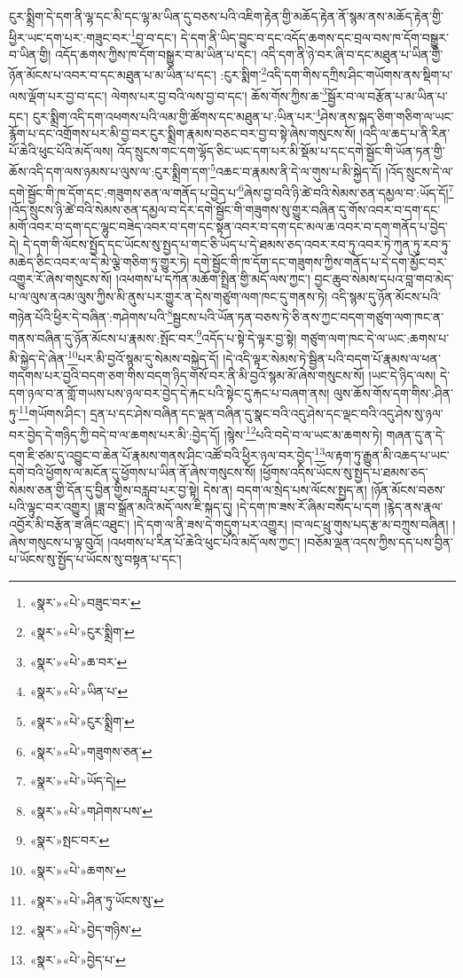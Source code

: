 ངུར་སྨྲིག་དེ་དག་ནི་ལྷ་དང་མི་དང་ལྷ་མ་ཡིན་དུ་བཅས་པའི་འཇིག་རྟེན་གྱི་མཆོད་རྟེན་ནོ་སྙམ་ནས་མཆོད་རྟེན་གྱི་ཕྱིར་ཡང་དག་པར་:གཟུང་བར་\footnote{«སྣར་»«པེ་»བཟུང་བར་}བྱ་བ་དང་། དེ་དག་ནི་ཡིད་བྱུང་བ་དང་འདོད་ཆགས་དང་བྲལ་བས་ཁ་དོག་བསྒྱུར་བ་ཡིན་གྱི། འདོད་ཆགས་ཀྱིས་ཁ་དོག་བསྒྱུར་བ་མ་ཡིན་པ་དང་། འདི་དག་ནི་ཉེ་བར་ཞི་བ་དང་མཐུན་པ་ཡིན་གྱི་ཉོན་མོངས་པ་འབར་བ་དང་མཐུན་པ་མ་ཡིན་པ་དང་། :ངུར་སྨིག་\footnote{«སྣར་»«པེ་»ངུར་སྨྲིག་}འདི་དག་གིས་དཀྲིས་ཤིང་གཡོགས་ནས་སྡིག་པ་ལས་ལྡོག་པར་བྱ་བ་དང་། ལེགས་པར་བྱ་བའི་ལས་བྱ་བ་དང་། ཆོས་གོས་ཀྱིས་ཆ་\footnote{«སྣར་»«པེ་»ཆ་བར་}སྦྱོར་བ་ལ་བརྩོན་པ་མ་ཡིན་པ་དང་། ངུར་སྨྲིག་འདི་དག་འཕགས་པའི་ལམ་གྱི་ཚོགས་དང་མཐུན་པ་:ཡིན་པར་\footnote{«སྣར་»«པེ་»ཡིན་པ་}ཤེས་ནས་སྐད་ཅིག་གཅིག་ལ་ཡང་རྙོག་པ་དང་འགྲོགས་པར་མི་བྱ་བར་ངུར་སྨྲིག་རྣམས་བཅང་བར་བྱ་བ་སྟེ་ཞེས་གསུངས་སོ། །འདི་ལ་ཆད་པ་ནི་རིན་པོ་ཆེའི་ཕུང་པོའི་མདོ་ལས། འོད་སྲུངས་གང་དག་ལྷོད་ཅིང་ཡང་དག་པར་མི་སྡོམ་པ་དང་དགེ་སྦྱོང་གི་ཡོན་ཏན་གྱི་ཆོས་འདི་དག་ལས་ཉམས་པ་ལུས་ལ་:ངུར་སྨྲིག་དག་\footnote{«སྣར་»«པེ་»ངུར་སྨྲིག་}འཆང་བ་རྣམས་ནི་དེ་ལ་གུས་པ་མི་སྐྱེད་དོ། །འོད་སྲུངས་དེ་ལ་དགེ་སྦྱོང་གི་ཁ་དོག་དང་:གཟུགས་ཅན་ལ་གནོད་པ་བྱེད་པ་\footnote{«སྣར་»«པེ་»གཟུགས་ཅན་}ཞེས་བྱ་བའི་ཉི་ཚེ་བའི་སེམས་ཅན་དམྱལ་བ་:ཡོད་དོ།\footnote{«སྣར་»«པེ་»ཡོད་དེ།} །འོད་སྲུངས་ཉི་ཚེ་བའི་སེམས་ཅན་དམྱལ་བ་དེར་དགེ་སྦྱོང་གི་གཟུགས་སུ་གྱུར་བཞིན་དུ་གོས་འབར་བ་དག་དང་མགོ་འབར་བ་དག་དང་ལྷུང་བཟེད་འབར་བ་དག་དང་སྟན་འབར་བ་དག་དང་མལ་ཆ་འབར་བ་དག་གནོད་པ་བྱེད་དེ། དེ་དག་གི་ལོངས་སྤྱོད་དང་ཡོངས་སུ་སྤྱད་པ་གང་ཅི་ཡོད་པ་དེ་ཐམས་ཅད་འབར་རབ་ཏུ་འབར་ཏེ་ཀུན་ཏུ་རབ་ཏུ་མཆེད་ཅིང་འབར་ལ་དེ་མེ་ལྕེ་གཅིག་ཏུ་གྱུར་ཏེ། དགེ་སྦྱོང་གི་ཁ་དོག་དང་གཟུགས་ཀྱིས་གནོད་པ་དེ་དག་མྱོང་བར་འགྱུར་རོ་ཞེས་གསུངས་སོ། །འཕགས་པ་དཀོན་མཆོག་སྤྲིན་གྱི་མདོ་ལས་ཀྱང་། བྱང་ཆུབ་སེམས་དཔའ་བླ་གབ་མེད་པ་ལ་ལུས་ནའམ་ལུས་ཀྱིས་མི་ནུས་པར་གྱུར་ན་དེས་གཙུག་ལག་ཁང་དུ་གནས་ཏེ། འདི་སྙམ་དུ་ཉོན་མོངས་པའི་གཉེན་པོའི་ཕྱིར་དེ་བཞིན་:གཤེགས་པའི་\footnote{«སྣར་»«པེ་»གཤེགས་པས་}སྦྱངས་པའི་ཡོན་ཏན་བཅས་ཏེ་ཅི་ནས་ཀྱང་བདག་གཙུག་ལག་ཁང་ན་གནས་བཞིན་དུ་ཉོན་མོངས་པ་རྣམས་:སྤོང་བར་\footnote{«སྣར་»སྤང་བར་}འདོད་པ་སྟེ་དེ་ལྟར་བྱ་སྟེ། གཙུག་ལག་ཁང་དེ་ལ་ཡང་:ཆགས་པ་མི་སྐྱེད་དེ་ཞེན་\footnote{«སྣར་»«པེ་»ཆགས་}པར་མི་བྱའོ་སྙམ་དུ་སེམས་བསྐྱེད་དོ། །དེ་འདི་ལྟར་སེམས་ཏེ་སྦྱིན་པའི་བདག་པོ་རྣམས་ལ་ཕན་གདགས་པར་བྱའི་བདག་ཅག་གིས་བདག་ཉིད་གསོ་བར་ནི་མི་བྱའོ་སྙམ་མོ་ཞེས་གསུངས་སོ། །ཡང་དེ་ཉིད་ལས། དེ་དག་ཉལ་བ་ན་གློ་གཡས་པས་ཉལ་བར་བྱེད་དེ་རྐང་པའི་སྟེང་དུ་རྐང་པ་བཞག་ནས། ལུས་ཆོས་གོས་དག་གིས་:ཤིན་ཏུ་\footnote{«སྣར་»«པེ་»ཤིན་ཏུ་ཡོངས་སུ་}གཡོགས་ཤིང་། དྲན་པ་དང་ཤེས་བཞིན་དང་ལྡན་བཞིན་དུ་སྣང་བའི་འདུ་ཤེས་དང་ལྡང་བའི་འདུ་ཤེས་སུ་ཉལ་བར་བྱེད་དེ་གཉིད་ཀྱི་བདེ་བ་ལ་ཆགས་པར་མི་:བྱེད་དོ། །སྙེས་\footnote{«སྣར་»«པེ་»བྱེད་གཉིས་}པའི་བདེ་བ་ལ་ཡང་མ་ཆགས་ཏེ། གཞན་དུ་ན་དེ་དག་ཇི་ཙམ་དུ་འབྱུང་བ་ཆེན་པོ་རྣམས་གནས་ཤིང་འཚོ་བའི་ཕྱིར་ཉལ་བར་བྱེད་\footnote{«སྣར་»«པེ་»བྱེད་པ་}ལ་རྟག་ཏུ་རྒྱུན་མི་འཆད་པ་ཡང་དགེ་བའི་ཕྱོགས་ལ་མངོན་དུ་ཕྱོགས་པ་ཡིན་ནོ་ཞེས་གསུངས་སོ། །ཕྱོགས་འདིས་ཡོངས་སུ་སྤྱད་པ་ཐམས་ཅད་སེམས་ཅན་གྱི་དོན་དུ་བྱིན་གྱིས་བརླབ་པར་བྱ་སྟེ། དེས་ན། བདག་ལ་སྲེད་པས་ལོངས་སྤྱད་ན། །ཉོན་མོངས་བཅས་པའི་ལྟུང་བར་འགྱུར། །ཟླ་བ་སྒྲོན་མའི་མདོ་ལས་ཇི་སྐད་དུ། །དེ་དག་ཁ་ཟས་རོ་ཞིམ་བསོད་པ་དག །རྙེད་ནས་རྣལ་འབྱོར་མི་བརྩོན་ཟ་ཞིང་འཐུང་། །དེ་དག་ལ་ནི་ཟས་དེ་གདུག་པར་འགྱུར། །བ་ལང་ཕྲུ་གུས་པད་རྩ་མ་བཀྲུས་བཞིན། །ཞེས་གསུངས་པ་ལྟ་བུའོ། །འཕགས་པ་རིན་པོ་ཆེའི་ཕུང་པོའི་མདོ་ལས་ཀྱང་། །བཅོམ་ལྡན་འདས་ཀྱིས་དད་པས་བྱིན་པ་ཡོངས་སུ་སྤྱོད་པ་ཡོངས་སུ་བསྟན་པ་དང་། 